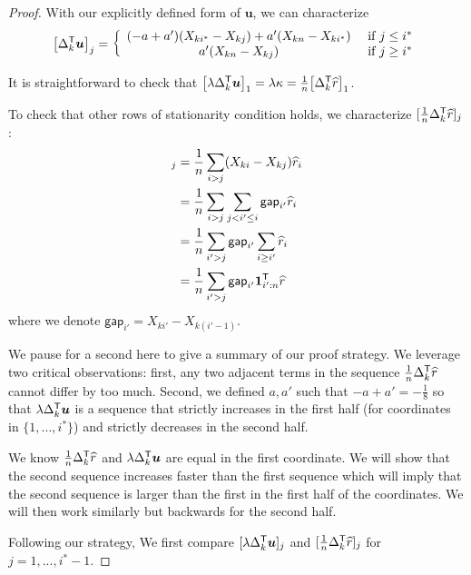 \begin{proof}
With our explicitly defined form of $\mathbf{u}$, we can characterize
\begin{align}
\big[ \Delta_k^{\mathsf{T}} \mbox{\boldmath $u$} \big]_j = 
  \left \{ \begin{array}{cc} 
   (-a + a')(X_{k i^*} - X_{kj})+ a'(X_{kn} - X_{k i^*})
   & \textrm{ if } j \leq i^* \\
   a'(X_{kn} - X_{kj}) & \textrm{ if } j \geq i^* 
     \end{array} \right.
\end{align} 

It is straightforward to check that $\big[ \lambda \Delta_k^{\mathsf{T}} \mbox{\boldmath $u$} \big]_1 = \lambda \kappa = \frac{1}{n} \big[ \Delta_k^{\mathsf{T}} \widehat{r} \big]_1$.

To check that other rows of stationarity condition holds, we characterize $[\frac{1}{n} \Delta_k^{\mathsf{T}} \widehat{r}]_j$:
\begin{align*}
[\frac{1}{n} \Delta_k^\tran \hat{r}]_j &= \frac{1}{n} \sum_{i > j} (X_{ki} - X_{kj}) \hat{r}_i \\
  & = \frac{1}{n} \sum_{i > j} \sum_{j < i' \leq i} \mathsf{gap}_{i'} \hat{r}_i \\
 & = \frac{1}{n} \sum_{i' > j} \mathsf{gap}_{i'} \sum_{i \geq i'} \hat{r}_i \\
 & = \frac{1}{n} \sum_{i' > j} \mathsf{gap}_{i'} \mathbf{1}_{i':n}^\tran \hat{r} 
\end{align*}
where we denote $\mathsf{gap}_{i'} = X_{ki'} - X_{k(i'-1)}$.

We pause for a second here to give a summary of our proof strategy. We leverage two critical observations: first, any two adjacent terms in the sequence $\frac{1}{n} \Delta_k^{\mathsf{T}} \widehat{r}$ cannot differ by too much. Second, we defined $a, a'$ such that $-a+a' = -\frac{1}{8}$ so that $\lambda \Delta_k^{\mathsf{T}} \mbox{\boldmath $u$}$ is a sequence that strictly increases in the first half (for coordinates in $\{1,...,i^*\}$) and strictly decreases in the second half. 

We know $\frac{1}{n} \Delta_k^{\mathsf{T}} \widehat{r}$ and $\lambda \Delta_k^{\mathsf{T}} \mbox{\boldmath $u$}$ are equal in the first coordinate. We will show that the second sequence increases faster than the first sequence which will imply that the second sequence is larger than the first in the first half of the coordinates. We will then work similarly but backwards for the second half. 


Following our strategy, We first compare $[\lambda \Delta_k^{\mathsf{T}} \mbox{\boldmath $u$}]_j$ and $[\frac{1}{n} \Delta_k^{\mathsf{T}} \widehat{r}]_j$ for $j=1,..., i^*-1$.


\end{proof}
